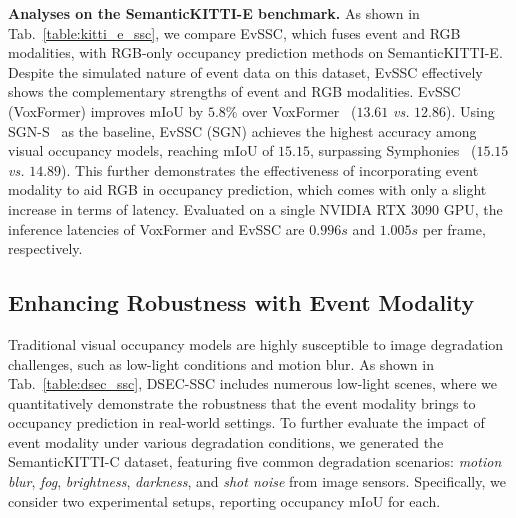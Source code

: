 \noindent \textbf{Analyses on the SemanticKITTI-E benchmark.}
%
As shown in Tab.~\ref{table:kitti_e_ssc}, we compare EvSSC, which fuses event and RGB modalities, with RGB-only occupancy prediction methods on SemanticKITTI-E. 
Despite the simulated nature of event data on this dataset, EvSSC effectively shows the complementary strengths of event and RGB modalities. 
EvSSC (VoxFormer) improves mIoU by $5.8\%$ over VoxFormer~\cite{li2023voxformer} ($13.61$ \textit{vs.} $12.86$). 
Using SGN-S~\cite{mei2024sgn} as the baseline, EvSSC (SGN) achieves the highest accuracy among visual occupancy models, reaching mIoU of $15.15$, surpassing 
%
Symphonies~\cite{jiang2024symphonize} ($15.15$ \textit{vs.} $14.89$). 
This further demonstrates the effectiveness of incorporating event modality to aid RGB in occupancy prediction, which comes with only a slight increase in terms of latency.
Evaluated on a single NVIDIA RTX 3090 GPU, the inference latencies of VoxFormer and EvSSC are $0.996s$ and $1.005s$ per frame, respectively.

%

\subsection{Enhancing Robustness with Event Modality}
%

Traditional visual occupancy models are highly susceptible to image degradation challenges, such as low-light conditions and motion blur. 
As shown in Tab.~\ref{table:dsec_ssc}, DSEC-SSC includes numerous low-light scenes, where we quantitatively demonstrate the robustness that the event modality brings to occupancy prediction in real-world settings. 
To further evaluate the impact of event modality under various degradation conditions, we generated the SemanticKITTI-C dataset, featuring five common degradation scenarios: \emph{motion blur}, \emph{fog}, \emph{brightness}, \emph{darkness}, and \emph{shot noise} from image sensors. 
Specifically, we consider two experimental setups, reporting occupancy mIoU for each.



